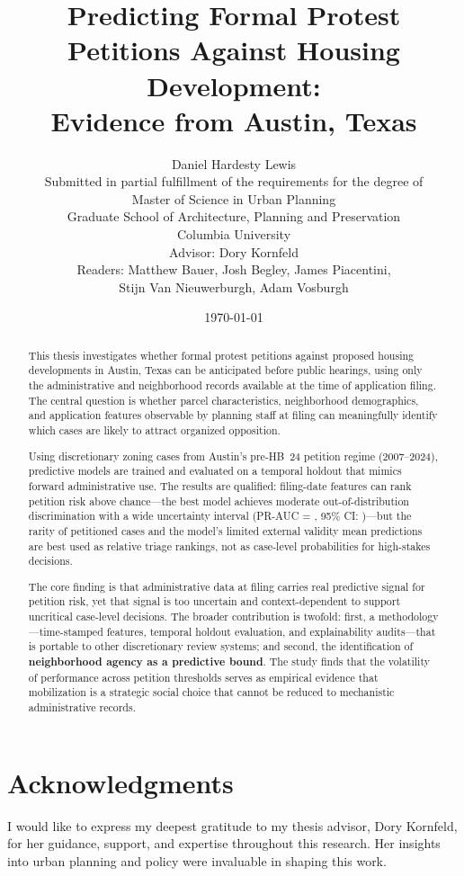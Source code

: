 \documentclass[11pt, letterpaper]{article}
\title{Predicting Formal Protest Petitions Against Housing Development:\\
Evidence from Austin, Texas}
\author{Daniel Hardesty Lewis\\[1em]
Submitted in partial fulfillment of the requirements for the degree of\\
Master of Science in Urban Planning\\[1em]
Graduate School of Architecture, Planning and Preservation\\
Columbia University\\[1em]
Advisor: Dory Kornfeld\\
Readers: Matthew Bauer, Josh Begley, James Piacentini,\\
Stijn Van Nieuwerburgh, Adam Vosburgh}
\date{\today}
\begin{document}
\sloppy
\maketitle

\begin{abstract}
This thesis investigates whether formal protest petitions against proposed housing developments in Austin, Texas can be anticipated before public hearings, using only the administrative and neighborhood records available at the time of application filing. The central question is whether parcel characteristics, neighborhood demographics, and application features observable by planning staff at filing can meaningfully identify which cases are likely to attract organized opposition.

Using discretionary zoning cases from Austin's pre-HB~24 petition regime (2007--2024), predictive models are trained and evaluated on a temporal holdout that mimics forward administrative use. The results are qualified: filing-date features can rank petition risk above chance---the best model achieves moderate out-of-distribution discrimination with a wide uncertainty interval (PR-AUC = \metricBootstrapFiling{}, 95\% CI: \metricBootstrapFilingCI{})---but the rarity of petitioned cases and the model's limited external validity mean predictions are best used as relative triage rankings, not as case-level probabilities for high-stakes decisions.

The core finding is that administrative data at filing carries real predictive signal for petition risk, yet that signal is too uncertain and context-dependent to support uncritical case-level decisions. The broader contribution is twofold: first, a methodology---time-stamped features, temporal holdout evaluation, and explainability audits---that is portable to other discretionary review systems; and second, the identification of \textbf{neighborhood agency as a predictive bound}. The study finds that the volatility of performance across petition thresholds serves as empirical evidence that mobilization is a strategic social choice that cannot be reduced to mechanistic administrative records.
\end{abstract}

\newpage
\section*{Acknowledgments}
I would like to express my deepest gratitude to my thesis advisor, Dory Kornfeld, for her guidance, support, and expertise throughout this research. Her insights into urban planning and policy were invaluable in shaping this work.
\end{document}
